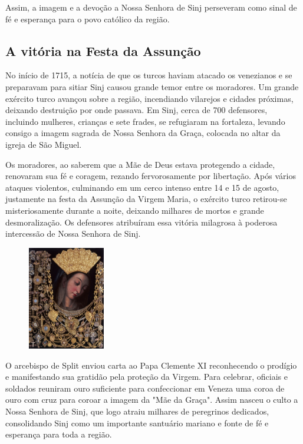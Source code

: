 \documentclass[a4paper,14pt]{extarticle} \usepackage[utf8]{inputenc}
\begin{document}
Assim, a imagem e a devoção a Nossa Senhora de Sinj perseveram como sinal de fé e esperança para o povo católico da região.

\subsection{A vitória na Festa da Assunção}

No início de 1715, a notícia de que os turcos haviam atacado os venezianos e se preparavam para sitiar Sinj causou grande temor entre os moradores. Um grande exército turco avançou sobre a região, incendiando vilarejos e cidades próximas, deixando destruição por onde passava. Em Sinj, cerca de 700 defensores, incluindo mulheres, crianças e sete frades, se refugiaram na fortaleza, levando consigo a imagem sagrada de Nossa Senhora da Graça, colocada no altar da igreja de São Miguel.

Os moradores, ao saberem que a Mãe de Deus estava protegendo a cidade, renovaram sua fé e coragem, rezando fervorosamente por libertação. Após vários ataques violentos, culminando em um cerco intenso entre 14 e 15 de agosto, justamente na festa da Assunção da Virgem Maria, o exército turco retirou-se misteriosamente durante a noite, deixando milhares de mortos e grande desmoralização. Os defensores atribuíram essa vitória milagrosa à poderosa intercessão de Nossa Senhora de Sinj.


\begin{figure} %
    \centering
    \includegraphics[width=0.30\textwidth]{assets/gospa-coroa.jpg}
\end{figure}

O arcebispo de Split enviou carta ao Papa Clemente XI reconhecendo o prodígio e manifestando sua gratidão pela proteção da Virgem. Para celebrar, oficiais e soldados reuniram ouro suficiente para confeccionar em Veneza uma coroa de ouro com cruz para coroar a imagem da "Mãe da Graça". Assim nasceu o culto a Nossa Senhora de Sinj, que logo atraiu milhares de peregrinos dedicados, consolidando Sinj como um importante santuário mariano e fonte de fé e esperança para toda a região.
\end{document}
